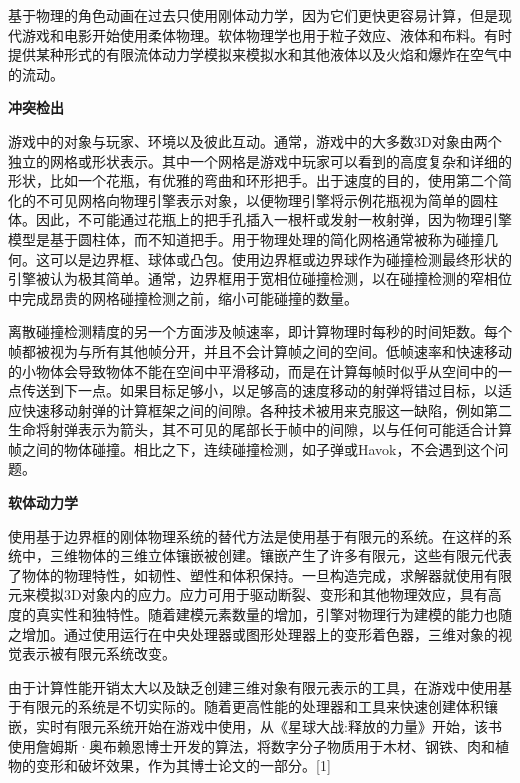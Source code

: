 基于物理的角色动画在过去只使用刚体动力学，因为它们更快更容易计算，但是现代游戏和电影开始使用柔体物理。软体物理学也用于粒子效应、液体和布料。有时提供某种形式的有限流体动力学模拟来模拟水和其他液体以及火焰和爆炸在空气中的流动。

\textbf{冲突检出}

游戏中的对象与玩家、环境以及彼此互动。通常，游戏中的大多数3D对象由两个独立的网格或形状表示。其中一个网格是游戏中玩家可以看到的高度复杂和详细的形状，比如一个花瓶，有优雅的弯曲和环形把手。出于速度的目的，使用第二个简化的不可见网格向物理引擎表示对象，以便物理引擎将示例花瓶视为简单的圆柱体。因此，不可能通过花瓶上的把手孔插入一根杆或发射一枚射弹，因为物理引擎模型是基于圆柱体，而不知道把手。用于物理处理的简化网格通常被称为碰撞几何。这可以是边界框、球体或凸包。使用边界框或边界球作为碰撞检测最终形状的引擎被认为极其简单。通常，边界框用于宽相位碰撞检测，以在碰撞检测的窄相位中完成昂贵的网格碰撞检测之前，缩小可能碰撞的数量。

离散碰撞检测精度的另一个方面涉及帧速率，即计算物理时每秒的时间矩数。每个帧都被视为与所有其他帧分开，并且不会计算帧之间的空间。低帧速率和快速移动的小物体会导致物体不能在空间中平滑移动，而是在计算每帧时似乎从空间中的一点传送到下一点。如果目标足够小，以足够高的速度移动的射弹将错过目标，以适应快速移动射弹的计算框架之间的间隙。各种技术被用来克服这一缺陷，例如第二生命将射弹表示为箭头，其不可见的尾部长于帧中的间隙，以与任何可能适合计算帧之间的物体碰撞。相比之下，连续碰撞检测，如子弹或Havok，不会遇到这个问题。

\textbf{软体动力学}

使用基于边界框的刚体物理系统的替代方法是使用基于有限元的系统。在这样的系统中，三维物体的三维立体镶嵌被创建。镶嵌产生了许多有限元，这些有限元代表了物体的物理特性，如韧性、塑性和体积保持。一旦构造完成，求解器就使用有限元来模拟3D对象内的应力。应力可用于驱动断裂、变形和其他物理效应，具有高度的真实性和独特性。随着建模元素数量的增加，引擎对物理行为建模的能力也随之增加。通过使用运行在中央处理器或图形处理器上的变形着色器，三维对象的视觉表示被有限元系统改变。

由于计算性能开销太大以及缺乏创建三维对象有限元表示的工具，在游戏中使用基于有限元的系统是不切实际的。随着更高性能的处理器和工具来快速创建体积镶嵌，实时有限元系统开始在游戏中使用，从《星球大战:释放的力量》开始，该书使用詹姆斯·奥布赖恩博士开发的算法，将数字分子物质用于木材、钢铁、肉和植物的变形和破坏效果，作为其博士论文的一部分。[1]

